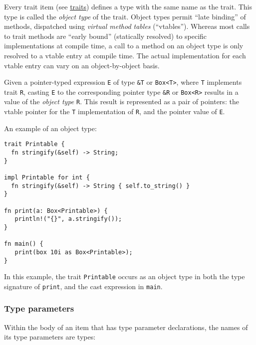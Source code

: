 \documentclass[]{article}
\begin{document}

Every trait item (see \hyperref[traits]{traits}) defines a type with the
same name as the trait. This type is called the \emph{object type} of
the trait. Object types permit ``late binding'' of methods, dispatched
using \emph{virtual method tables} (``vtables''). Whereas most calls to
trait methods are ``early bound'' (statically resolved) to specific
implementations at compile time, a call to a method on an object type is
only resolved to a vtable entry at compile time. The actual
implementation for each vtable entry can vary on an object-by-object
basis.

Given a pointer-typed expression \texttt{E} of type \texttt{\&T} or
\texttt{Box\textless{}T\textgreater{}}, where \texttt{T} implements
trait \texttt{R}, casting \texttt{E} to the corresponding pointer type
\texttt{\&R} or \texttt{Box\textless{}R\textgreater{}} results in a
value of the \emph{object type} \texttt{R}. This result is represented
as a pair of pointers: the vtable pointer for the \texttt{T}
implementation of \texttt{R}, and the pointer value of \texttt{E}.

An example of an object type:

\begin{verbatim}
trait Printable {
  fn stringify(&self) -> String;
}

impl Printable for int {
  fn stringify(&self) -> String { self.to_string() }
}

fn print(a: Box<Printable>) {
   println!("{}", a.stringify());
}

fn main() {
   print(box 10i as Box<Printable>);
}
\end{verbatim}

In this example, the trait \texttt{Printable} occurs as an object type
in both the type signature of \texttt{print}, and the cast expression in
\texttt{main}.

\subsubsection{Type parameters}\label{type-parameters-1}

Within the body of an item that has type parameter declarations, the
names of its type parameters are types:
\end{document}

